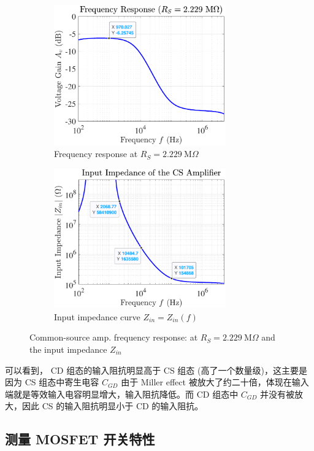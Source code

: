 \documentclass[UTF8]{article}
\begin{document}
\vspace*{-3mm}
\begin{figure}[H]\centering
\begin{subfigure}[b]{0.5\columnwidth}\centering
    \includegraphics[width=210pt]{LCE-04-场效应管/assets/cd amp/cd gain, R_S = 2M229.pdf}\hspace*{8mm}
    \caption{Frequency response at $R_S = 2.229 \ \mathrm{M}\Omega$}
\end{subfigure}\hfill
\begin{subfigure}[b]{0.5\columnwidth}\centering
    \includegraphics[width=210pt]{LCE-04-场效应管/assets/cd amp/cd Z_in.pdf}
    \hspace*{8mm}
    \caption{Input impedance curve $Z_{in} = Z_{in}(f)$}
\end{subfigure}
\caption{Common-source amp. frequency response:  at $R_S = 2.229 \ \mathrm{M}\Omega$ and the input impedance $Z_{in}$}
\end{figure}

可以看到， CD 组态的输入阻抗明显高于 CS 组态 (高了一个数量级)，这主要是因为 CS 组态中寄生电容 $C_{GD}$ 由于 Miller effect 被放大了约二十倍，体现在输入端就是等效输入电容明显增大，输入阻抗降低。而 CD 组态中 $C_{GD}$ 并没有被放大，因此 CS 的输入阻抗明显小于 CD 的输入阻抗。

\subsection{测量 MOSFET 开关特性}
\end{document}
